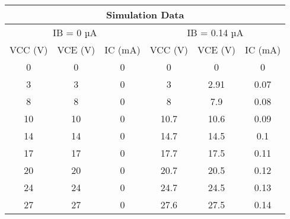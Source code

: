 \documentclass[a4paper, 12pt]{extarticle}
\begin{document}
\newpage
\restoregeometry
{}
\begin{table}[htbp]
  \centering
    \begin{tabular}{cccccc}
    \toprule
    \multicolumn{6}{|c|}{Simulation Data} \\
    \midrule
    \multicolumn{3}{|c|}{IB = 0 µA} & \multicolumn{3}{c|}{IB = 0.14 µA} \\
    \midrule
    \multicolumn{1}{|c|}{VCC (V)} & \multicolumn{1}{c|}{VCE (V)} & \multicolumn{1}{c|}{IC (mA)} & \multicolumn{1}{c|}{VCC (V)} & \multicolumn{1}{c|}{VCE (V)} & \multicolumn{1}{c|}{IC (mA)} \\
    \midrule
    \multicolumn{1}{|c|}{0} & \multicolumn{1}{c|}{0} & \multicolumn{1}{c|}{0} & \multicolumn{1}{c|}{0} & \multicolumn{1}{c|}{0} & \multicolumn{1}{c|}{0} \\
    \midrule
    \multicolumn{1}{|c|}{3} & \multicolumn{1}{c|}{3} & \multicolumn{1}{c|}{0} & \multicolumn{1}{c|}{3} & \multicolumn{1}{c|}{2.91} & \multicolumn{1}{c|}{0.07} \\
    \midrule
    \multicolumn{1}{|c|}{8} & \multicolumn{1}{c|}{8} & \multicolumn{1}{c|}{0} & \multicolumn{1}{c|}{8} & \multicolumn{1}{c|}{7.9} & \multicolumn{1}{c|}{0.08} \\
    \midrule
    \multicolumn{1}{|c|}{10} & \multicolumn{1}{c|}{10} & \multicolumn{1}{c|}{0} & \multicolumn{1}{c|}{10.7} & \multicolumn{1}{c|}{10.6} & \multicolumn{1}{c|}{0.09} \\
    \midrule
    \multicolumn{1}{|c|}{14} & \multicolumn{1}{c|}{14} & \multicolumn{1}{c|}{0} & \multicolumn{1}{c|}{14.7} & \multicolumn{1}{c|}{14.5} & \multicolumn{1}{c|}{0.1} \\
    \midrule
    \multicolumn{1}{|c|}{17} & \multicolumn{1}{c|}{17} & \multicolumn{1}{c|}{0} & \multicolumn{1}{c|}{17.7} & \multicolumn{1}{c|}{17.5} & \multicolumn{1}{c|}{0.11} \\
    \midrule
    \multicolumn{1}{|c|}{20} & \multicolumn{1}{c|}{20} & \multicolumn{1}{c|}{0} & \multicolumn{1}{c|}{20.7} & \multicolumn{1}{c|}{20.5} & \multicolumn{1}{c|}{0.12} \\
    \midrule
    \multicolumn{1}{|c|}{24} & \multicolumn{1}{c|}{24} & \multicolumn{1}{c|}{0} & \multicolumn{1}{c|}{24.7} & \multicolumn{1}{c|}{24.5} & \multicolumn{1}{c|}{0.13} \\
    \midrule
    \multicolumn{1}{|c|}{27} & \multicolumn{1}{c|}{27} & \multicolumn{1}{c|}{0} & \multicolumn{1}{c|}{27.6} & \multicolumn{1}{c|}{27.5} & \multicolumn{1}{c|}{0.14} \\

\end{tabular}
\end{table}
\end{document}
